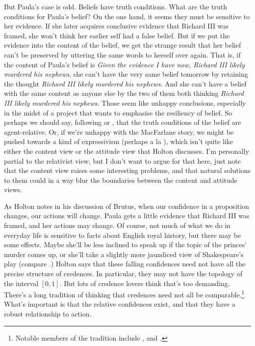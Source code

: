 But Paula's case is odd. Beliefs have truth conditions. What are the truth conditions for Paula's belief? On the one hand, it seems they must be sensitive to her evidence. If she later acquires conclusive evidence that Richard III was framed, she won't think her earlier self had a false belief. But if we put the evidence into the content of the belief, we get the strange result that her belief can't be preserved by uttering the same words to herself over again. That is, if the content of Paula's belief is \textit{Given the evidence I have now, Richard III likely murdered his nephews}, she can't have the very same belief tomorrow by retaining the thought \textit{Richard III likely murdered his nephews}. And she can't have a belief with the same content as anyone else by the two of them both thinking \textit{Richard III likely murdered his nephews}. Those seem like unhappy conclusions, especially in the midst of a project that wants to emphasise the resiliency of belief. So perhaps we should say, following \citet{Stephenson2007} or \citet{MacFarlane2011}, that the truth conditions of the belief are agent-relative. Or, if we're unhappy with the MacFarlane story, we might be pushed towards a kind of expressivism (perhaps a la \citet{Yalcin2011}), which isn't quite like either the content view or the attitude view that Holton discusses. I'm personally partial to the relativist view, but I don't want to argue for that here, just note that the content view raises some interesting problems, and that natural solutions to them could in a way blur the boundaries between the content and attitude views.

As Holton notes in his discussion of Brutus, when our confidence in a proposition changes, our actions will change. Paula gets a little evidence that Richard III was framed, and her actions may change. Of course, not much of what we do in everyday life is sensitive to facts about English royal history, but there may be some effects. Maybe she'll be less inclined to speak up if the topic of the princes' murder comes up, or she'll take a slightly more jaundiced view of Shakespeare's play (compare \citet{Friend2003}.) Holton says that these falling confidences need not have all the precise structure of credences. In particular, they may not have the topology of the interval $[0, 1]$. But lots of credence lovers think that's too demanding. There's a long tradition of thinking that credences need not all be comparable.\footnote{Notable members of the tradition include \citet{Levi1974}, \citet{Jeffrey1983} and \citet{vanFraassen1989}.} What's important is that the relative confidences exist, and that they have a robust relationship to action.

